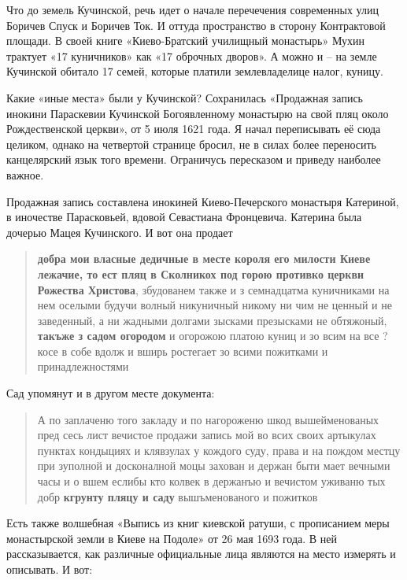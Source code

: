Что до земель Кучинской, речь идет о начале перечечения современных улиц Боричев Спуск и Боричев Ток. И оттуда пространство в сторону Контрактовой площади. В своей книге «Киево-Братский училищный монастырь» Мухин трактует «17 куничников» как «17 оброчных дворов». А можно и – на земле Кучинской обитало 17 семей, которые платили землевладелице налог, куницу.

Какие «иные места» были у Кучинской? Сохранилась «Продажная запись инокини Параскевии Кучинской Богоявленному монастырю на свой пляц около Рождественской церкви»\cite{muhin01}, от 5 июля 1621 года. Я начал переписывать её сюда целиком, однако на четвертой странице бросил, не в силах более переносить канцелярский язык того времени. Ограничусь пересказом и приведу наиболее важное.

Продажная запись составлена инокиней Киево-Печер\-ского монастыря Катериной, в иночестве Парасковьей, вдовой Севастиана Фронцевича. Катерина была дочерью Мацея Кучинского. И вот она продает 

\begin{quotation}
\textbf{добра мои власные дедичные в месте короля его милости Киеве лежачие, то ест пляц в Сколникох под горою противко цер\-кви Рожества Христова}, збудованем также и з семнадцатма куничниками на нем оселыми будучи волный никуничный никому ни чим не ценный и не заведенный, а ни жадными долгами зысками презысками не обтяжоный, \textbf{такъже з садом огородом} и огорожою платою куниц и зо всим на все ?косе в собе вдолж и вширь ростегает зо всими пожитками и принадлежностями \end{quotation}

Сад упомянут и в другом месте документа:

\begin{quotation}
А по заплаченю того закладу и по нагороженю шкод вышейменованых пред сесь лист вечистое продажи запись мой во всих своих артыкулах пунктах кондыциях и клявзулах у кождого суду, права и на пождом местцу при зуполной и досконалной моцы захован и держан быти мает вечными часы и о вшем еслибы кто колвек в держанъю и вечистом уживаню тых добр \textbf{кгрунту пляцу и саду} вышъменованого и пожитков
\end{quotation}

Есть также волшебная «Выпись из книг киевской ратуши, с прописанием меры монастырской земли в Киеве на Подоле»\cite{muhin01} от 26 мая 1693 года. В ней рассказывается, как различные официальные лица являются на место измерять и описывать. И вот:

